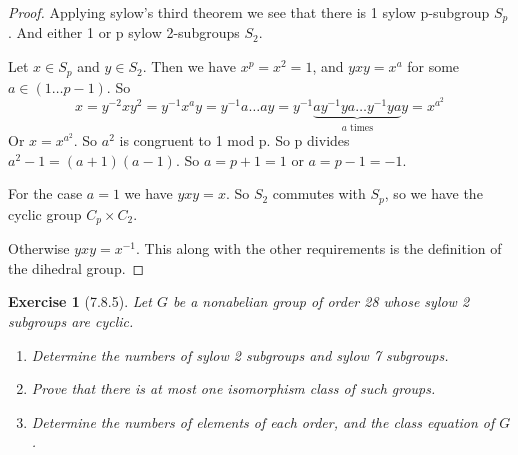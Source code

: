 \documentclass[12pt]{article}
\newtheorem*{exer}{Exercise}
\begin{document}
\begin{proof}

    Applying sylow's third theorem we see that there is 1 sylow
    p-subgroup $S_p$. And either 1 or p sylow 2-subgroups $S_2$. 

    Let $x \in S_p$ and $y \in S_2$. Then we have $x^p = x^2 = 1$, and
    $yxy = x^a$ for some $a \in (1 \dots p-1)$. So
    \[
        x = y^{-2}xy^2 = y^{-1}x^ay = y^{-1} a \dots a y =
        y^{-1}\underbrace{a y^{-1}y a \dots y^{-1}y a}_\text{$a$ times}y =
        x^{a^2}
    \]
    Or $x = x^{a^2}$. So $a^2$ is congruent to 1 mod p. So p divides
    $a^2 - 1 = (a + 1)(a - 1)$. So $a = p + 1 = 1$ or $a = p - 1 = -1$.

    For the case $a = 1$ we have $yxy = x$. So $S_2$ commutes with
    $S_p$, so we have the cyclic group $C_p \times C_2$. 

    Otherwise $yxy = x^{-1}$. This along with the other requirements is the
    definition of the dihedral group. 

\end{proof}


\begin{exer}[7.8.5]

    Let $G$ be a nonabelian group of order 28 whose sylow 2 subgroups
    are cyclic.

    \begin{enumerate}
        \item Determine the numbers of sylow 2 subgroups and sylow 7
            subgroups.

        \item Prove that there is at most one isomorphism class of such
            groups.

        \item Determine the numbers of elements of each order, and the
            class equation of $G$.
    \end{enumerate}

\end{exer}
\end{document}
